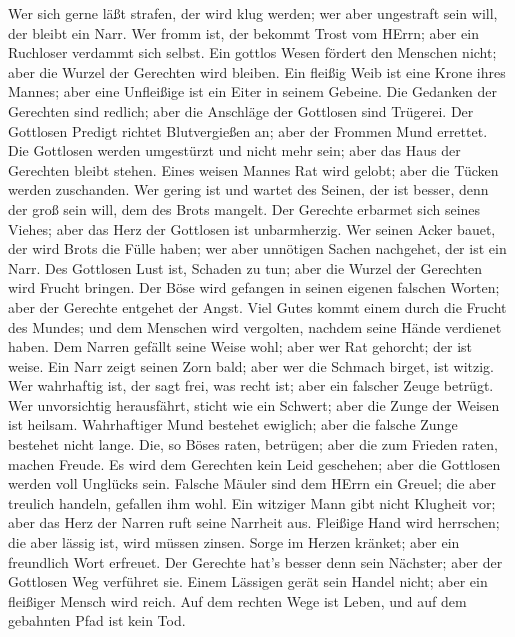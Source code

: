  Wer sich gerne läßt strafen, der wird klug werden; wer aber
ungestraft sein will, der bleibt ein Narr.  Wer fromm ist,
der bekommt Trost vom HErrn; aber ein Ruchloser verdammt sich selbst.
 Ein gottlos Wesen fördert den Menschen nicht; aber die
Wurzel der Gerechten wird bleiben.  Ein fleißig Weib ist
eine Krone ihres Mannes; aber eine Unfleißige ist ein Eiter in seinem
Gebeine.  Die Gedanken der Gerechten sind redlich; aber die
Anschläge der Gottlosen sind Trügerei.  Der Gottlosen
Predigt richtet Blutvergießen an; aber der Frommen Mund errettet.
 Die Gottlosen werden umgestürzt und nicht mehr sein; aber
das Haus der Gerechten bleibt stehen.  Eines weisen Mannes
Rat wird gelobt; aber die Tücken werden zuschanden.  Wer
gering ist und wartet des Seinen, der ist besser, denn der groß sein
will, dem des Brots mangelt.  Der Gerechte erbarmet sich
seines Viehes; aber das Herz der Gottlosen ist unbarmherzig.
 Wer seinen Acker bauet, der wird Brots die Fülle haben;
wer aber unnötigen Sachen nachgehet, der ist ein Narr.  Des
Gottlosen Lust ist, Schaden zu tun; aber die Wurzel der Gerechten wird
Frucht bringen.  Der Böse wird gefangen in seinen eigenen
falschen Worten; aber der Gerechte entgehet der Angst. 
Viel Gutes kommt einem durch die Frucht des Mundes; und dem Menschen
wird vergolten, nachdem seine Hände verdienet haben.  Dem
Narren gefällt seine Weise wohl; aber wer Rat gehorcht; der ist weise.
 Ein Narr zeigt seinen Zorn bald; aber wer die Schmach
birget, ist witzig.  Wer wahrhaftig ist, der sagt frei, was
recht ist; aber ein falscher Zeuge betrügt.  Wer
unvorsichtig herausfährt, sticht wie ein Schwert; aber die Zunge der
Weisen ist heilsam.  Wahrhaftiger Mund bestehet ewiglich;
aber die falsche Zunge bestehet nicht lange.  Die, so Böses
raten, betrügen; aber die zum Frieden raten, machen Freude.
 Es wird dem Gerechten kein Leid geschehen; aber die
Gottlosen werden voll Unglücks sein.  Falsche Mäuler sind
dem HErrn ein Greuel; die aber treulich handeln, gefallen ihm wohl.
 Ein witziger Mann gibt nicht Klugheit vor; aber das Herz
der Narren ruft seine Narrheit aus.  Fleißige Hand wird
herrschen; die aber lässig ist, wird müssen zinsen.  Sorge
im Herzen kränket; aber ein freundlich Wort erfreuet.  Der
Gerechte hat's besser denn sein Nächster; aber der Gottlosen Weg
verführet sie.  Einem Lässigen gerät sein Handel nicht;
aber ein fleißiger Mensch wird reich.  Auf dem rechten Wege
ist Leben, und auf dem gebahnten Pfad ist kein Tod.

